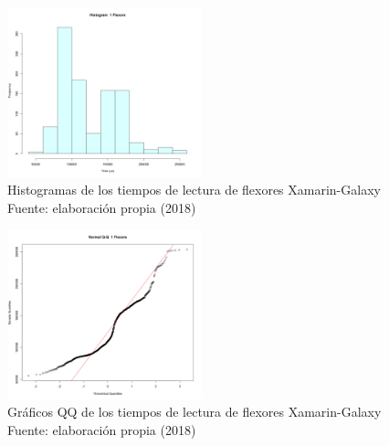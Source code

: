 \begin{figure}
 \begin{center} 
   	\includegraphics[width=0.5\textwidth]{evaluation/graphics/Xamarin/Galaxy/HistFlexorsXamarinGalaxy.png} 
   	\captionsetup{justification=centering}
    \caption[Histogramas de los tiempos de lectura de flexores Xamarin-Galaxy]{Histogramas de los tiempos de lectura de flexores Xamarin-Galaxy\\Fuente: elaboración propia (2018)} 
    \label{fig:xamarin-galaxy-hist-flexors}
  \end{center}
\end{figure}

\begin{figure}[H]
  \begin{center} 
   	\includegraphics[width=0.5\textwidth]{evaluation/graphics/Xamarin/Galaxy/NormalQQFlexorsXamarinGalaxy.png} 
   	\captionsetup{justification=centering}
    \caption[Gráfico QQ de los tiempos de lectura de flexores Xamarin-Galaxy]{Gráficos QQ de los tiempos de lectura de flexores Xamarin-Galaxy\\Fuente: elaboración propia (2018)} 
    \label{fig:xamarin-galaxy-QQ-flexors}
  \end{center}
\end{figure}

